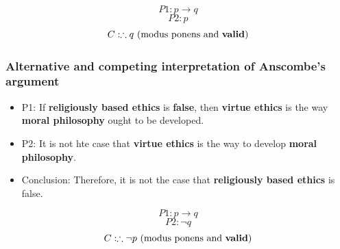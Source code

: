 \documentclass[11pt]{article}
\begin{document}
\[P1: p \rightarrow q\]
\[P2: p\]
\[C: \therefore q \ (\text{modus ponens and \textbf{valid}})\]
\subsubsection{Alternative and competing interpretation of Anscombe's argument}
\label{sec:org0400fe9}
\begin{itemize}
\item P1: If \textbf{religiously based ethics} is \textbf{false}, then \textbf{virtue ethics} is the way \textbf{moral philosophy} ought to be developed.
\item P2: It is not hte case that \textbf{virtue ethics} is the way to develop \textbf{moral philosophy}.
\item Conclusion: Therefore, it is not the case that \textbf{religiously based ethics} is false.
\end{itemize}

\[P1: p \rightarrow q\]
\[P2: \neg q\]
\[C: \therefore \neg p \ (\text{modus ponens and \textbf{valid}})\]

 \newpage
\end{document}
